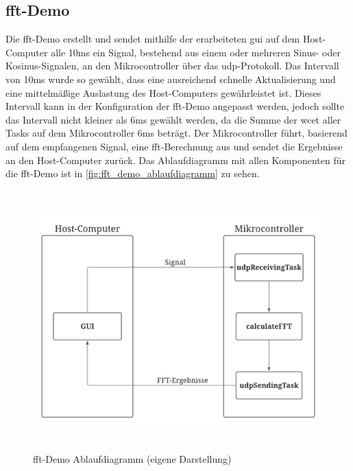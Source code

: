 \documentclass[../EDF Master Thesis.tex]{subfiles}
\begin{document}
    \clearpage

    \subsection{\acf{fft}-Demo} \label{section:fft_demo}

        Die \ac{fft}-Demo erstellt und sendet mithilfe der erarbeiteten \ac{gui} auf dem Host-Computer alle 10ms ein Signal, bestehend aus einem oder mehreren Sinus- oder Kosinus-Signalen, an den Mikrocontroller über das \ac{udp}-Protokoll.
        Das Intervall von 10ms wurde so gewählt, dass eine ausreichend schnelle Aktualisierung und eine mittelmäßige Auslastung des Host-Computers gewährleistet ist.
        Dieses Intervall kann in der Konfiguration der \ac{fft}-Demo angepasst werden, jedoch sollte das Intervall nicht kleiner als 6ms gewählt werden, da die Summe der \ac{wcet} aller Tasks auf dem Mikrocontroller 6ms beträgt.
        Der Mikrocontroller führt, basierend auf dem empfangenen Signal, eine \ac{fft}-Berechnung aus und sendet die Ergebnisse an den Host-Computer zurück.
        Das Ablaufdiagramm mit allen Komponenten für die \ac{fft}-Demo ist in \autoref{fig:fft_demo_ablaufdiagramm} zu sehen.

        \begin{figure}[H]
            \centering
            \includegraphics[height=10cm, width=14cm]{./attachments/FFT Ablauf.pdf}
            \caption[\ac{fft}-Demo Ablaufdiagramm]{\ac{fft}-Demo Ablaufdiagramm (eigene Darstellung)}
            \label{fig:fft_demo_ablaufdiagramm}
        \end{figure}
\end{document}
